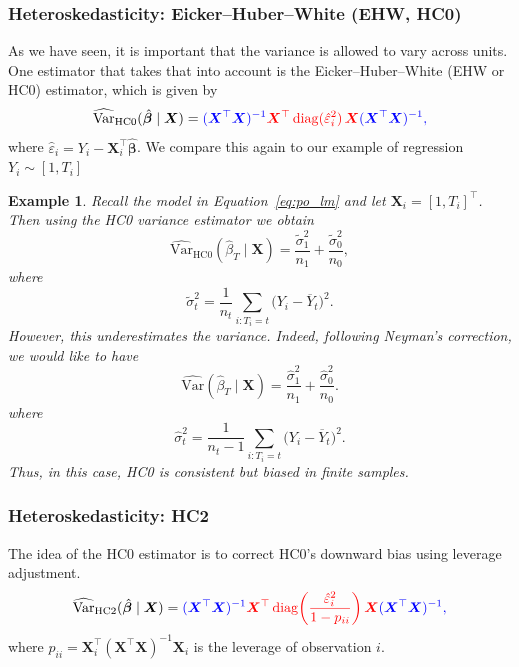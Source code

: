 \documentclass[11pt]{exam}
\theoremstyle{plain}
\newtheorem{example}{Example}
\DeclareMathOperator{\diag}{diag}
\newcommand{\bX}{\bm{X}}
\newcommand{\Var}{\mathrm{Var}}
\begin{document}
\subsubsection{Heteroskedasticity: Eicker–Huber–White (EHW, HC0)}
As we have seen, it is important that the variance is allowed to vary across units. One estimator that takes that into account is the Eicker–Huber–White (EHW or HC0) estimator, which is given by
 \[
  \widehat{\Var}_{\mathrm{HC0}}(\hat{\bm{\beta}} \mid \bX)
  = \color{blue}{(\bX^\top \bX)^{-1}}
    \color{red}{\bX^\top \diag(\hat{\varepsilon}_i^2)\,\bX}
    \color{blue}{(\bX^\top \bX)^{-1}},
  \]
  where $\hat{\varepsilon}_i = Y_i - \bX_i^\top \hat{\bm{\beta}}$.
We compare this again to our example of regression $Y_i \sim [1, T_i]$
\begin{example}
Recall the model in Equation~\eqref{eq:po_lm} and let $\bX_i = [1, T_i]^\top$. Then using the HC0 variance estimator we obtain
    \[
  \widehat{\Var}_{\mathrm{HC0}}(\hat{\beta}_T \mid \bX)
  = \frac{\tilde{\sigma}_1^2}{n_1} + \frac{\tilde{\sigma}_0^2}{n_0},
  \]
  where
  \[
  \tilde{\sigma}_t^2 = \frac{1}{n_t}\sum_{i:T_i=t}\big(Y_i-\overline{Y}_t\big)^2.
  \]
  However, this underestimates the variance. Indeed, following Neyman’s correction, we would like to have
  \[
    \widehat{\Var}(\hat{\beta}_T \mid \bX) = \frac{\hat\sigma_1^2}{n_1} + \frac{\hat\sigma_0^2}{n_0}.
    \] 
    where
  \[
  \hat{\sigma}_t^2
  = \frac{1}{n_t-1}\sum_{i:T_i=t}\big(Y_i-\overline{Y}_t\big)^2.
  \]
  Thus, in this case, HC0 is \emph{consistent} but biased in finite samples.
\end{example}

\subsubsection{Heteroskedasticity: HC2}
The idea of the HC0 estimator is to correct HC0’s downward bias using leverage adjustment.
\[
  \widehat{\Var}_{\mathrm{HC2}}(\hat{\bm{\beta}} \mid \bX)
  = \color{blue}{(\bX^\top \bX)^{-1}}
    \color{red}{\bX^\top \diag\!\left(\frac{\hat{\varepsilon}_i^2}{1 - p_{ii}}\right)\bX}
    \color{blue}{(\bX^\top \bX)^{-1}},
  \]
  where $p_{ii} = \bX_i^\top(\bX^\top\bX)^{-1}\bX_i$ is the leverage of observation $i$.
\end{document}
